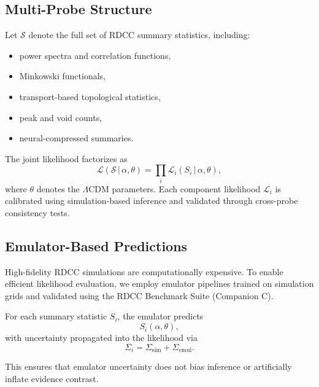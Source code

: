 \documentclass[11pt,a4paper]{article}
\begin{document}
\subsection{Multi-Probe Structure}

Let $\mathcal{S}$ denote the full set of RDCC summary statistics, including:

\begin{itemize}
    \item power spectra and correlation functions,
    \item Minkowski functionals,
    \item transport-based topological statistics,
    \item peak and void counts,
    \item neural-compressed summaries.
\end{itemize}

The joint likelihood factorizes as
\begin{equation}
    \mathcal{L}(\mathcal{S}\,|\,\alpha,\theta)
    =
    \prod_{i}
    \mathcal{L}_{i}(S_{i}\,|\,\alpha,\theta),
\end{equation}
where $\theta$ denotes the $\Lambda$CDM parameters. Each component likelihood
$\mathcal{L}_{i}$ is calibrated using simulation-based inference and validated
through cross-probe consistency tests.

\subsection{Emulator-Based Predictions}

High-fidelity RDCC simulations are computationally expensive. To enable efficient
likelihood evaluation, we employ emulator pipelines trained on simulation grids
and validated using the RDCC Benchmark Suite (Companion C).

For each summary statistic $S_{i}$, the emulator predicts
\begin{equation}
    S_{i}(\alpha,\theta),
\end{equation}
with uncertainty propagated into the likelihood via
\begin{equation}
    \Sigma_{i}
    =
    \Sigma_{\mathrm{sim}}
    +
    \Sigma_{\mathrm{emul}}.
\end{equation}

This ensures that emulator uncertainty does not bias inference or artificially
inflate evidence contrast.
\end{document}
